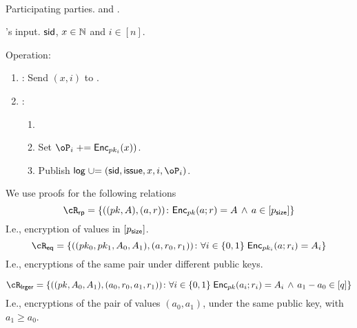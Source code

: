 \begin{protocol}~\label{prot:ConfidentialTransactions:Issue}
	\item[Participating parties.] \Ic and \Cc.
	
	
	\item[\Cc's input.] $\mathsf{sid}$, $x\in {\mathbb{N}}$ and $i\in [n]$.
	
	\item[Operation:] ~
	
	
	\begin{enumerate}
		
		\item   \Ic: Send $(x,i)$ to \Cc.
		
		\item \Cc:  
		\begin{enumerate}
			\item {}
			
			\item Set $\oP_i \pluseq \Enc_{pk_i}(x))$.
				
		\item Publish $\historylog \unioneq (\sid,\issue,x,i,\oP_i)$.
				 	
		\end{enumerate}
		
	\end{enumerate}
\end{protocol}


\newcommand{\RPs}{{\sf rp}}
\newcommand{\rRP}{\cR_\RPs}

\newcommand{\rRPDef}
{
	\set{((pk,A),(a,r))\colon \Enc_{pk}(a;r)= A \sland a\in [\psize]}
}


\newcommand{\Eqs}{{\sf eq}}
\newcommand{\rEQ}{\cR_\Eqs}

\newcommand{\rEQDef}
{
	\set{((pk_0,pk_1,A_0,A_1),(a,r_0,r_1))\colon \forall i\in \zo \; \Enc_{pk_i}(a;r_i)= A_i}
}

\newcommand{\Lrgs}{{\sf lrger}}
\newcommand{\rLrg}{\cR_\Lrgs}

\newcommand{\rLrgDef}
{
	\set{((pk,A_0,A_1),(a_0,r_0,a_1,r_1))\colon \forall i\in \zo \; \Enc_{pk}(a_i;r_i)= A_i \sland a_1 -a_0 \in [q]} 
}

We use proofs for the   following  relations  
$$\rRP =\rRPDef$$
I.e., encryption of values in $[p_{\mathsf{size}}]$.
$$\rEQ =\rEQDef$$
I.e., encryptions of the same pair under different public keys.


$$\rLrg =\rLrgDef$$
I.e., encryptions of the  pair of values $(a_0,a_1)$, under the same public key, with $a_1 \ge a_0$.

